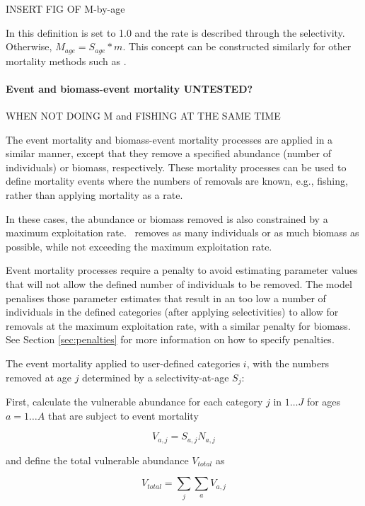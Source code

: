 INSERT FIG OF M-by-age

In this definition  is set to 1.0 and the rate is described through the selectivity. Otherwise, $M_{age} = S_{age} * m$. This concept can be constructed similarly for other mortality methods such as .

\paragraph{Event and biomass-event mortality UNTESTED?}

WHEN NOT DOING M and FISHING AT THE SAME TIME

The event mortality and biomass-event mortality processes are applied in a similar manner, except that they remove a specified abundance (number of individuals) or biomass, respectively. These mortality processes can be used to define mortality events where the numbers of removals are known, e.g., fishing, rather than applying mortality as a rate.

In these cases, the abundance or biomass removed is also constrained by a maximum exploitation rate. \CNAME~removes as many individuals or as much biomass as possible,  while not exceeding the maximum exploitation rate.

Event mortality processes require a penalty to avoid estimating parameter values that will not allow the defined number of individuals to be removed. The model penalises those parameter estimates that result in an too low a number of individuals in the defined categories (after applying selectivities) to allow for removals at the maximum exploitation rate, with a similar penalty for biomass. See Section \ref{sec:penalties} for more information on how to specify penalties.

The event mortality applied to user-defined categories $i$, with the numbers removed at age $j$ determined by a selectivity-at-age $S_j$:

First, calculate the vulnerable abundance for each category $j$ in $1 \ldots J$ for ages $a = 1 \ldots A$ that are subject to event mortality

\begin{equation}
  V_{a,j} = S_{a,j} N_{a,j}
\end{equation}

and define the total vulnerable abundance $V_{total}$ as

\begin{equation}
  V_{total}  = \sum\limits_j {\sum\limits_a {V_{a,j}}}
\end{equation}

